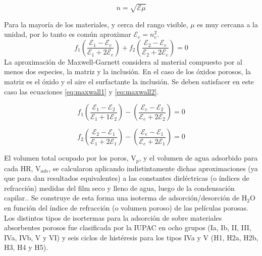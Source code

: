 						\begin{equation}
					 	   n=\sqrt{\mathcal{E}\mu}
					 	   \label{eq:indice}
						\end{equation}
		
		\pagebreak 

		Para la mayoría de los materiales, y cerca del rango visible, $\mu$ es muy cercana a la unidad, por lo tanto es común aproximar $\mathcal{E}_e=n_e^2$.
							\begin{equation}
					 		   	 f_1\left(\frac{\mathcal{E}_1-\mathcal{E}_e}{\mathcal{E}_1+2\mathcal{E}_e}\right)+
					 		   	 f_2\left(\frac{\mathcal{E}_2-\mathcal{E}_e}{\mathcal{E}_2+2\mathcal{E}_e}\right)=0
					 		     \label{eq:bruggeman}
								\end{equation}
		La aproximación de Maxwell-Garnett considera al material compuesto por al menos dos especies, la matriz y la inclusión. En el caso de los óxidos porosos, la matriz es el óxido y el aire el surfactante la inclusión. Se deben satisfacer en este caso las ecuaciones \ref{eq:maxwall1} y \ref{eq:maxwall2}.
				
							\begin{equation}
					 		   	 f_1\left(\frac{\mathcal{E}_1-\mathcal{E}_2}{\mathcal{E}_1+1\mathcal{E}_2}\right)-
					 		   	 \left(\frac{\mathcal{E}_e-\mathcal{E}_2}{\mathcal{E}_e+2\mathcal{E}_2}\right)=0
					 		     \label{eq:maxwall1}
								\end{equation}
						
								\begin{equation}
					 		   	 f_2\left(\frac{\mathcal{E}_2-\mathcal{E}_1}{\mathcal{E}_1+2\mathcal{E}_1}\right)-
					 		   	 \left(\frac{\mathcal{E}_e-\mathcal{E}_1}{\mathcal{E}_e+2\mathcal{E}_1}\right)=0
					 		     \label{eq:maxwall2}
								\end{equation}
		
		El volumen total ocupado por los poros, V$_p$, y el volumen de agua adsorbido para cada HR, V$_{ads}$, se calcularon aplicando indistintamente dichas aproximaciones (ya que para \pdm\space dan resultados equivalentes) a las constantes dieléctricas (o índices de refracción) medidas del film seco y lleno de agua, luego de la condensación capilar.\cite{Angelome2008,Fuertes2009,Nano-compuestas2013}. Se construye de esta forma una isoterma de adsorción/desorción de H$_2$O en función del índice de refracción (o volumen poroso) de las películas porosas. Los distintos tipos de isortermas para la adsorción de sobre materiales absorbentes porosos fue clasificada por la IUPAC en ocho grupos (Ia, Ib, II, III, IVa, IVb, V y VI) y seis ciclos de histéresis para los tipos IVa y V (H1, H2a, H2b, H3, H4 y H5). \cite{Thommes2015}

